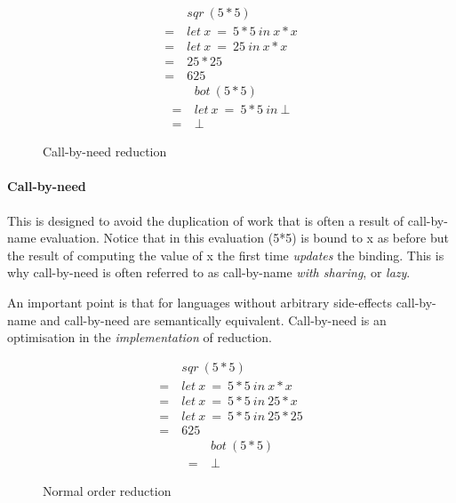 \begin{figure}[!h]
\centering
\begin{multicols}{2}
\noindent
\begin{align*}
     &sqr\ (5*5) \\
  =\ &let\ x\ =\ 5 * 5\ in\ x * x \\
  =\ &let\ x\ =\ 25\ in\ x * x \\
  =\ &25 * 25 \\
  =\ &625
\end{align*}
\begin{align*}
     &bot\ (5*5) \\
  =\ &let\ x\ =\ 5*5\ in\ \bot \\
  =\ &\bot
\end{align*}
\end{multicols}
\caption{Call-by-need reduction}
\label{fig:call-by-need}
\end{figure}

\paragraph{Call-by-need} This is designed to avoid the duplication of work that
is often a result of call-by-name evaluation. Notice that in this evaluation
\<(5*5)\> is bound to \<x\> as before but the result of computing the value of
\<x\> the first time \emph{updates} the binding. This is why call-by-need is
often referred to as call-by-name \emph{with sharing}, or \emph{lazy}.

An important point is that for languages without arbitrary side-effects call-by-name
and call-by-need are semantically equivalent. Call-by-need is an optimisation in the
\emph{implementation} of reduction.


\begin{figure}[!h]
\centering
\begin{multicols}{2}
\noindent
\begin{align*}
     &sqr\ (5*5) \\
  =\ &let\ x\ =\ 5 * 5\ in\ x * x \\
  =\ &let\ x\ =\ 5 * 5\ in\ 25 * x \\
  =\ &let\ x\ =\ 5 * 5\ in\ 25 * 25 \\
  =\ &625
\end{align*}
\begin{align*}
     &bot\ (5*5) \\
  =\ &\bot
\end{align*}
\end{multicols}
\caption{Normal order reduction}
\label{fig:normal-order}
\end{figure}


